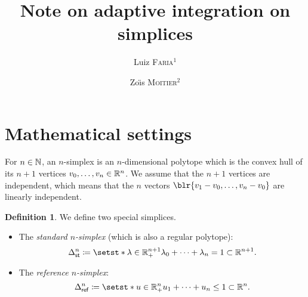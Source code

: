 \documentclass[english,12pt]{article}
\title{Note on adaptive integration on simplices}
\author{
    Luiz \textsc{Faria}\({}^1\)
    \and
    Zo{\"\i}s \textsc{Moitier}\({}^2\)
}
\date{\raggedright\footnotesize%
    \({^1}\)POEMS, CNRS, Inria, ENSTA Paris, Institut Polytechnique de Paris, 91120 Palaiseau, France.\\
    \({}^2\)IDEFIX, Inria, ENSTA Paris, Institut Polytechnique de Paris, 91120 Palaiseau, France.\\[1em]
    \large\Red{\textbf{\today}}
}
\numberwithin{equation}{section}
\DeclarePairedDelimiter{\blr}\lbrace\rbrace%
\theoremstyle{definition}
\newtheorem{definition}{Definition}[section]
\theoremstyle{plain}
\theoremstyle{remark}
\begin{document}
\maketitle




\section{Mathematical settings}

For \( n  \in \mathbb{N} \), an \( n \)-simplex is an \( n \)-dimensional polytope which is the convex hull of its \( n+1 \) vertices \( v_0, \ldots, v_n \in \mathbb{R}^n \).
We assume that the \( n+1 \) vertices are independent, which means that the \( n \) vectors \( \blr{v_1 - v_0, \ldots, v_n - v_0} \) are linearly independent.

\begin{definition}
    We define two special simplices.
    \begin{itemize}
        \item The \emph{standard \( n \)-simplex} (which is also a regular polytope):
              \[
                  \Simplex_\St^n \coloneqq \setst*{\lambda \in \bbR_+^{n+1}}{\lambda_0 + \cdots + \lambda_n = 1} \subset \bbR^{n+1}.
              \]

        \item The \emph{reference \( n \)-simplex}:
              \[
                  \Simplex_\Rf^n \coloneqq \setst*{u \in \bbR_+^n}{u_1 + \cdots + u_n \leq 1} \subset \bbR^n.
              \]
    \end{itemize}
\end{definition}








\end{document}

